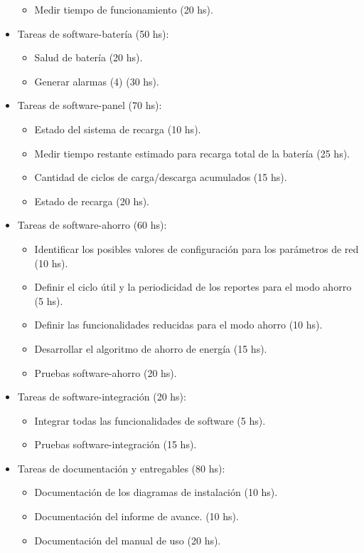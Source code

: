 \begin{itemize}
\begin{itemize}
	\item Medir tiempo de funcionamiento (20 hs).
	\end{itemize}
	\item Tareas de software-batería (50 hs):
	\begin{itemize}
	\item Salud de batería (20 hs).
	\item Generar alarmas (4) (30 hs).
	\end{itemize}
	\item Tareas de software-panel (70 hs):
	\begin{itemize}
	\item Estado del sistema de recarga (10 hs).
	\item Medir tiempo restante estimado para recarga total de la batería (25 hs).
	\item Cantidad de ciclos de carga/descarga acumulados (15 hs).
	\item Estado de recarga (20 hs).
	\end{itemize}
	\item Tareas de software-ahorro (60 hs):
	\begin{itemize}
	\item Identificar los posibles valores de configuración para los parámetros de red (10 hs).
	\item Definir el ciclo útil y la periodicidad de los reportes para el modo ahorro (5 hs).
	\item Definir las funcionalidades reducidas para el modo ahorro (10 hs).
	\item Desarrollar el algoritmo de ahorro de energía (15 hs).
	\item Pruebas software-ahorro (20 hs).
	\end{itemize}
	\item Tareas de software-integración (20 hs):
	\begin{itemize}
	\item Integrar todas las funcionalidades de software (5 hs).
	\item Pruebas software-integración (15 hs).  
	\end{itemize}
	\item Tareas de documentación y entregables (80 hs):
	\begin{itemize}
	\item Documentación de los diagramas de instalación (10 hs).
	\item Documentación del informe de avance. (10 hs).
	\item Documentación del manual de uso (20 hs).

\end{itemize}
\end{itemize}
